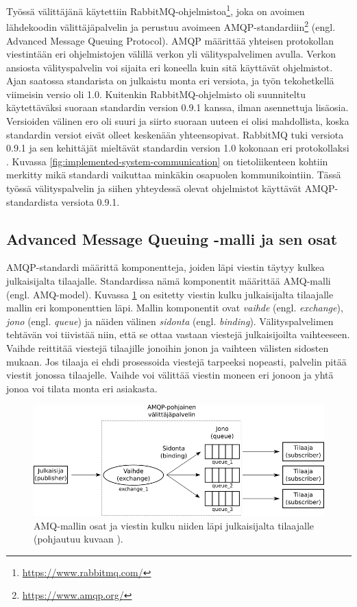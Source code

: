 Työssä välittäjänä käytettiin RabbitMQ-ohjelmistoa\footnote{\url{https://www.rabbitmq.com/}}, joka on avoimen lähdekoodin välittäjäpalvelin ja perustuu avoimeen AMQP-standardiin\footnote{\url{https://www.amqp.org/}} (engl. Advanced Message Queuing Protocol). AMQP määrittää yhteisen protokollan viestintään eri ohjelmistojen välillä verkon yli välityspalvelimen avulla. Verkon ansiosta välityspalvelin voi sijaita eri koneella kuin sitä käyttävät ohjelmistot. Ajan saatossa standarista on julkaistu monta eri versiota, ja työn tekohetkellä viimeisin versio oli 1.0. Kuitenkin RabbitMQ-ohjelmisto oli suunniteltu käytettäväksi suoraan standardin version 0.9.1 kanssa, ilman asennettuja lisäosia. Versioiden välinen ero oli suuri ja siirto suoraan uuteen ei olisi mahdollista, koska standardin versiot eivät olleet keskenään yhteensopivat. RabbitMQ tuki versiota 0.9.1 ja sen kehittäjät mieltävät standardin version 1.0 kokonaan eri protokollaksi \cite{RabbitMQ-Compatibility-and-Conformance}. Kuvassa \ref{fig:implemented-system-communication} on tietoliikenteen kohtiin merkitty mikä standardi vaikuttaa minkäkin osapuolen kommunikointiin. Tässä työssä välityspalvelin ja siihen yhteydessä olevat ohjelmistot käyttävät AMQP-standardista versiota 0.9.1.


\subsection{Advanced Message Queuing -malli ja sen osat}
AMQP-standardi määrittä komponentteja, joiden läpi viestin täytyy kulkea julkaisijalta tilaajalle. Standardissa nämä komponentit määrittää AMQ-malli (engl. AMQ-model). Kuvassa \ref{fig:amq-model-parts} on esitetty viestin kulku julkaisijalta tilaajalle mallin eri  komponenttien läpi. Mallin komponentit ovat \emph{vaihde} (engl. \emph{exchange}), \emph{jono} (engl. \emph{queue}) ja näiden välinen \emph{sidonta} (engl. \emph{binding}). Välityspalvelimen tehtävän voi tiivistää niin, että se ottaa vastaan viestejä julkaisijoilta vaihteeseen. Vaihde reittitää viestejä tilaajille jonoihin jonon ja vaihteen välisten sidosten mukaan. Jos tilaaja ei ehdi prosessoida viestejä tarpeeksi nopeasti, palvelin pitää viestit jonossa tilaajelle. Vaihde voi välittää viestin moneen eri jonoon ja yhtä jonoa voi tilata monta eri asiakasta.

\begin{figure}[ht!]
	\includegraphics[width=1\textwidth]{pictures/amq-model-parts.png}
	\caption{AMQ-mallin osat ja viestin kulku niiden läpi julkaisijalta tilaajalle (pohjautuu kuvaan \cite[s.~11]{AMQP-specification}).}
	\label{fig:amq-model-parts}
\end{figure}

